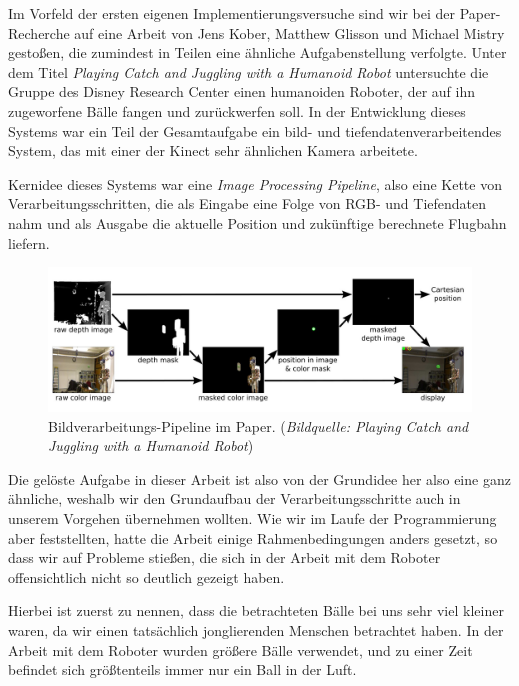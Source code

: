 \documentclass[12pt,a4paper,ngerman]{scrartcl}
\begin{document}
Im Vorfeld der ersten eigenen Implementierungsversuche sind wir bei der
Paper-Recherche auf eine Arbeit von Jens Kober, Matthew Glisson und Michael Mistry
gestoßen, die zumindest in Teilen eine ähnliche Aufgabenstellung verfolgte.
Unter dem Titel {\em Playing Catch and Juggling with a Humanoid Robot}\cite{kober}
untersuchte die Gruppe des Disney Research Center\cite{disneyresearch} einen
humanoiden Roboter, der auf ihn zugeworfene Bälle fangen und zurückwerfen soll.
In der Entwicklung dieses Systems war ein Teil der Gesamtaufgabe ein
bild- und tiefendatenverarbeitendes System, das mit einer der Kinect sehr ähnlichen
Kamera arbeitete.

Kernidee dieses Systems war eine \textit{Image Processing Pipeline}, also eine
Kette von Verarbeitungsschritten, die als Eingabe eine Folge von RGB- und Tiefendaten
nahm und als Ausgabe die aktuelle Position und zukünftige berechnete Flugbahn
liefern.

\begin{figure}[H]
    \centering
    \includegraphics[scale=0.31]{img/koberpipeline.jpg}
    \caption{Bildverarbeitungs-Pipeline im Paper. ({\em Bildquelle: Playing Catch and Juggling with a Humanoid Robot\cite{kober}})}
    \label{koberpipeline}
\end{figure}

Die gelöste Aufgabe in dieser Arbeit ist also von der Grundidee her also eine ganz
ähnliche, weshalb wir den Grundaufbau der Verarbeitungsschritte auch in unserem
Vorgehen übernehmen wollten. Wie wir im Laufe der Programmierung aber feststellten,
hatte die Arbeit einige Rahmenbedingungen anders gesetzt, so dass wir auf Probleme
stießen, die sich in der Arbeit mit dem Roboter offensichtlich nicht so deutlich
gezeigt haben.

Hierbei ist zuerst zu nennen, dass die betrachteten Bälle bei uns sehr viel kleiner
waren, da wir einen tatsächlich jonglierenden Menschen betrachtet haben. In der
Arbeit mit dem Roboter wurden größere Bälle verwendet, und zu einer Zeit befindet
sich größtenteils immer nur ein Ball in der Luft.
\end{document}

